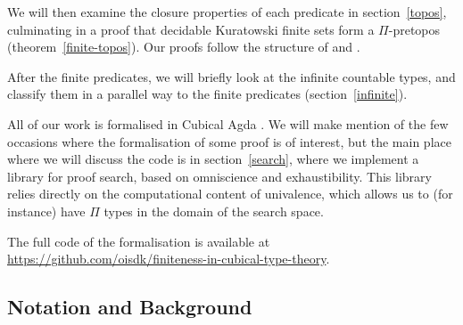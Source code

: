 We will then examine the closure properties of each predicate in
section~\ref{topos}, culminating in a proof that decidable Kuratowski finite
sets form a \(\Pi\)-pretopos (theorem~\ref{finite-topos}).
Our proofs follow the structure of \cite[Chapters 9, 10]{hottbook} and
\cite{rijkeSetsHomotopyType2015}.

After the finite predicates, we will briefly look at the infinite countable
types, and classify them in a parallel way to the finite predicates
(section~\ref{infinite}).

All of our work is formalised in Cubical Agda
\cite{vezzosiCubicalAgdaDependently2019}.
We will make mention of the few occasions where the formalisation of some proof
is of interest, but the main place where we will discuss the code is in
section~\ref{search}, where we implement a library for proof search, based on
omniscience and exhaustibility.
This library relies directly on the computational content of univalence, which
allows us to (for instance) have \(\Pi\) types in the domain of the search
space.

The full code of the formalisation is available at
\url{https://github.com/oisdk/finiteness-in-cubical-type-theory}.
\subsection{Notation and Background}
